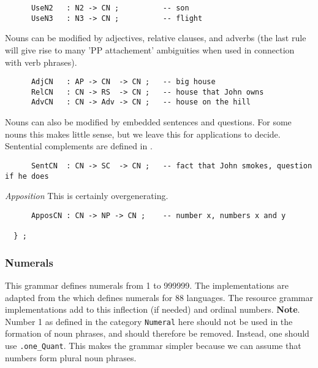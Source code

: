 \documentclass[11pt,a4paper]{article}
\newcommand{\commOut}[1]{}
\newcommand{\subsubsubsection}[1]{\textit{#1}}
\begin{document}
\begin{verbatim}
      UseN2   : N2 -> CN ;          -- son
      UseN3   : N3 -> CN ;          -- flight
\end{verbatim}

Nouns can be modified by adjectives, relative clauses, and adverbs
(the last rule will give rise to many 'PP attachement' ambiguities
when used in connection with verb phrases).

\begin{verbatim}
      AdjCN   : AP -> CN  -> CN ;   -- big house
      RelCN   : CN -> RS  -> CN ;   -- house that John owns
      AdvCN   : CN -> Adv -> CN ;   -- house on the hill
\end{verbatim}

Nouns can also be modified by embedded sentences and questions.
For some nouns this makes little sense, but we leave this for applications
to decide. Sentential complements are defined in .

\begin{verbatim}
      SentCN  : CN -> SC  -> CN ;   -- fact that John smokes, question if he does
\end{verbatim}

\subsubsubsection{Apposition}
This is certainly overgenerating.

\begin{verbatim}
      ApposCN : CN -> NP -> CN ;    -- number x, numbers x and y
  
  } ;
\end{verbatim}

\commOut{Produced by 
gfdoc - a rudimentary GF document generator.
(c) Aarne Ranta (\htmladdnormallink{aarne@cs.chalmers.se}{mailto:aarne@cs.chalmers.se}) 2002 under GNU GPL.}


\subsubsection{Numerals}
This grammar defines numerals from 1 to 999999. 
The implementations are adapted from the
which defines numerals for 88 languages.
The resource grammar implementations add to this inflection (if needed)
and ordinal numbers.
\textbf{Note}. Number 1 as defined 
in the category \texttt{Numeral} here should not be used in the formation of
noun phrases, and should therefore be removed. Instead, one should use
\texttt{.one\_Quant}. This makes the grammar simpler
because we can assume that numbers form plural noun phrases.
\end{document}
